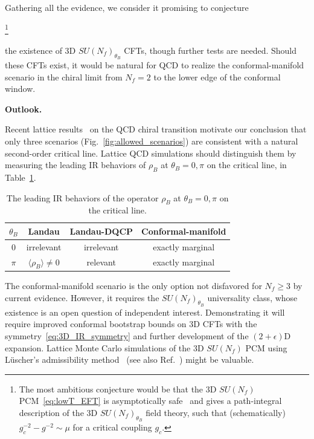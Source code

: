 \documentclass[
 reprint,







nofootinbib,


 amsmath,amssymb,
 aps,
 prd






tightenlines
]{revtex4-2}
\begin{document}
Gathering all the evidence, we consider it promising to conjecture

\footnote{
The most ambitious conjecture would be that the 3D $SU(N_f)$ PCM~\eqref{eq:lowT_EFT} is asymptotically safe~\cite{Wilson:1973jj,Weinberg:1976xy} and gives a path-integral description of the 3D $SU(N_f)_{\theta_B}$ field theory, such that (schematically) $g_c^{-2}-g^{-2}\sim\mu$ for a critical coupling $g_c$.
}

the existence of 3D $SU(N_f)_{\theta_B}$ CFTs, though further tests are
needed. Should these CFTs exist, it would be natural for QCD to realize
the conformal-manifold scenario in the chiral limit from $N_f=2$ to the
lower edge of the conformal window.



{\bf Outlook.}


Recent lattice results~\cite{Cuteri:2021ikv,Dini:2021hug,Nakamura:2022abk,Zhang:2022kzb,Zhang:2024ldl,Zhang:2025vns,Klinger:2025xxb,DAmbrosio:2025ldv,Klinger:2026pbe}
on the QCD chiral transition motivate our conclusion that only three scenarios
(Fig.~\ref{fig:allowed_scenarios}) are consistent with a natural
second-order critical line.  Lattice QCD simulations should distinguish
them by measuring the leading IR behaviors of $\rho_B$ at
$\theta_B =0,\pi$ on the critical line, in
Table~\ref{tab:fingerprints}.
\begin{table}[ht]
    \centering
    \renewcommand{\arraystretch}{1.5}
    \begin{tabular}{|c|c|c|c|}
        \hline
         $\theta_B$ & \textbf{Landau} & \textbf{Landau-DQCP} & \textbf{Conformal-manifold}  \\
        \hline
        $0$ & irrelevant & irrelevant & exactly marginal \\ \hline
        $\pi$ & $\langle\rho_B\rangle\neq0$ & relevant & exactly marginal \\ \hline
    \end{tabular}
    \caption{The leading IR behaviors of the operator $\rho_B$ at $\theta_B =0,\pi$ on the critical line.}
    \label{tab:fingerprints}
\end{table}

The conformal-manifold scenario is the only option not disfavored for
$N_f\ge3$ by current evidence. However, it requires the
$SU(N_f)_{\theta_B}$ universality class, whose existence is an open
question of independent interest. Demonstrating it will require improved
conformal bootstrap bounds on 3D CFTs with the
symmetry~\eqref{eq:3D_IR_symmetry} and further development of the
$(2+\epsilon)$D expansion. Lattice Monte Carlo simulations of the 3D
$SU(N_f)$ PCM using L\"uscher's admissibility
method~\cite{Luscher:1981zq,Schramm:2000cc,Shiozaki:2024yrm,Lopez-Contreras:2025iik}
(see also Ref.~\cite{Chen:2024ddr}) might be valuable.
\end{document}
